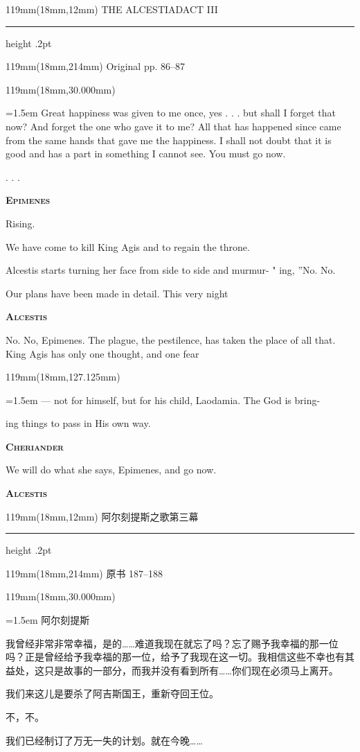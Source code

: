 \documentclass{article}
\newcommand{\ENsetup}{\normalfont\color{ink}\fontsize{11}{16.5}\selectfont\emergencystretch=1.5em}
\newcommand{\ZHsetup}{\normalfont\color{ink}\fontsize{10.5}{17}\selectfont\emergencystretch=1.5em}
\newcommand{\ENspeaker}[1]{{\fontsize{9.8}{13}\selectfont\scshape\bfseries #1}\par\vspace{3pt}}
\newcommand{\ZHspeaker}[1]{{\hei\fontsize{10.3}{13}\selectfont #1}\par\vspace{3pt}}
\newcommand{\Block}[3]{\begin{textblock*}{119mm}(18mm,#1mm){#2 #3\par}\end{textblock*}}
\newcommand{\Heading}[3]{%
  \begin{textblock*}{119mm}(18mm,12mm)
    \color{quiet}\fontsize{7.5}{10}\selectfont
    #1\hfill #2\par\vspace{3mm}\hrule height .2pt
  \end{textblock*}
  \begin{textblock*}{119mm}(18mm,214mm)
    \color{quiet}\fontsize{7}{10}\selectfont #3\hfill\thepage
  \end{textblock*}
}
\begin{document}
\newpage
\null
\Heading{THE ALCESTIAD}{ACT III}{Original pp. 86–87}
\Block{30.000}{\ENsetup}{\sloppy
Great happiness was given to me once, yes . . . but shall I forget that now? And forget the one who gave it to me? All that has happened since came from the same hands that gave me the happiness. I shall not doubt that it is good and has a part in something I cannot see. You must go now.\par\vspace{2pt}
. . .\par\vspace{2pt}
\ENspeaker{Epimenes}
Rising.\par\vspace{2pt}
We have come to kill King Agis and to regain the throne.\par\vspace{2pt}
Alcestis starts turning her face from side to side and murmur- " ing, ''No. No.\par\vspace{2pt}
Our plans have been made in detail. This very night\par\vspace{2pt}
\ENspeaker{Alcestis}
No. No, Epimenes. The plague, the pestilence, has taken the place of all that. King Agis has only one thought, and one fear\par\vspace{2pt}}
\Block{127.125}{\ENsetup}{\sloppy
— not for himself, but for his child, Laodamia. The God is bring-\par\vspace{2pt}
ing things to pass in His own way.\par\vspace{2pt}
\ENspeaker{Cheriander}
We will do what she says, Epimenes, and go now.\par\vspace{2pt}
\ENspeaker{Alcestis}}
\newpage
\null
\Heading{阿尔刻提斯之歌}{第三幕}{原书 187–188}
\Block{30.000}{\ZHsetup}{\ZHspeaker{阿尔刻提斯}我曾经非常非常幸福，是的……难道我现在就忘了吗？忘了赐予我幸福的那一位吗？正是曾经给予我幸福的那一位，给予了我现在这一切。我相信这些不幸也有其益处，这只是故事的一部分，而我并没有看到所有……你们现在必须马上离开。\par \vspace{2.2mm}\ZHspeaker{伊皮伊尼兹}{\kai （起身）}我们来这儿是要杀了阿吉斯国王，重新夺回王位。\par \vspace{2.2mm}\ZHspeaker{阿尔刻提斯}{\kai （一边摇头一边小声说着）}不，不。\par \vspace{2.2mm}\ZHspeaker{伊皮伊尼兹}我们已经制订了万无一失的计划。就在今晚……\par }
\end{document}
